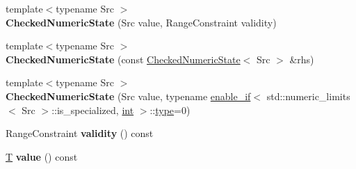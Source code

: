 \begin{DoxyCompactItemize}
\item 
\mbox{\label{classv8_1_1base_1_1internal_1_1CheckedNumericState_3_01T_00_01NUMERIC__INTEGER_01_4_ad28239c47fe6bb23981cba9ca1aa85e0}} 
{\footnotesize template$<$typename Src $>$ }\\{\bfseries Checked\+Numeric\+State} (Src value, Range\+Constraint validity)
\item 
\mbox{\label{classv8_1_1base_1_1internal_1_1CheckedNumericState_3_01T_00_01NUMERIC__INTEGER_01_4_a0df9c94921b36e5155b7e49179c72d11}} 
{\footnotesize template$<$typename Src $>$ }\\{\bfseries Checked\+Numeric\+State} (const \mbox{\hyperlink{classv8_1_1base_1_1internal_1_1CheckedNumericState}{Checked\+Numeric\+State}}$<$ Src $>$ \&rhs)
\item 
\mbox{\label{classv8_1_1base_1_1internal_1_1CheckedNumericState_3_01T_00_01NUMERIC__INTEGER_01_4_a379f680bb18c028b5bbbd1c4ba51a0e4}} 
{\footnotesize template$<$typename Src $>$ }\\{\bfseries Checked\+Numeric\+State} (Src value, typename \mbox{\hyperlink{structv8_1_1base_1_1internal_1_1enable__if}{enable\+\_\+if}}$<$ std\+::numeric\+\_\+limits$<$ Src $>$\+::is\+\_\+specialized, \mbox{\hyperlink{classint}{int}} $>$\+::\mbox{\hyperlink{classstd_1_1conditional_1_1type}{type}}=0)
\item 
\mbox{\label{classv8_1_1base_1_1internal_1_1CheckedNumericState_3_01T_00_01NUMERIC__INTEGER_01_4_ab7c80b6ba38ca5c730676a4c7249c5d4}} 
Range\+Constraint {\bfseries validity} () const
\item 
\mbox{\label{classv8_1_1base_1_1internal_1_1CheckedNumericState_3_01T_00_01NUMERIC__INTEGER_01_4_af2be8e987dc38eb524924dab2eba9b7b}} 
\mbox{\hyperlink{classv8_1_1internal_1_1torque_1_1T}{T}} {\bfseries value} () const
\end{DoxyCompactItemize}
